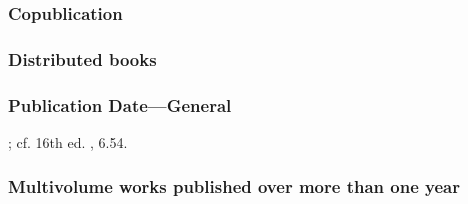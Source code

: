 \documentclass[11pt,letterpaper,oneside]{article}
\begin{document}
\begin{citebib}
\item \cite{karavaev2015}
\item \cite{shumaker2014}
\end{citebib}

\setcounter{subsubsection}{139}
\subsubsection{Copublication}

\begin{citebib}
\item \cite{strauss1962}
\end{citebib}

\subsubsection{Distributed books}

\begin{citebib}
\item \cite{willke2007}
\end{citebib}

\subsubsection{Publication Date---General}
\label{14.142}

\begin{citebib}
\item \cite*[6.56]{chicago2017}; cf. 16th ed. \parencite*{chicago2010}, 6.54.
\item \cite{turabian2013}
\end{citebib}

\setcounter{subsubsection}{143}
\subsubsection{Multivolume works published over more than one year}
\label{14.144}

\begin{citebib}
\item \cite[329]{hayek2011}
\item \cite{tillich1951}
\end{citebib}
\end{document}
